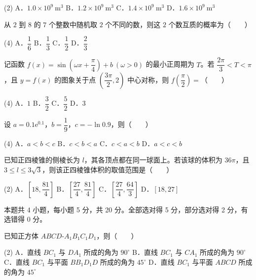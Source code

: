 \begin{gkopts}(2)
\task A．$1.0\times10^{9}\ \mathrm m^{3}$
\task B．$1.2\times10^{9}\ \mathrm m^{3}$
\task C．$1.4\times10^{9}\ \mathrm m^{3}$
\task D．$1.6\times10^{9}\ \mathrm m^{3}$
\end{gkopts}

从 $2$ 到 $8$ 的 $7$ 个整数中随机取 $2$ 个不同的数，则这 $2$ 个数互质的概率为（　　）

\begin{gkopts}(4)
\task A．$\dfrac16$
\task B．$\dfrac13$
\task C．$\dfrac12$
\task D．$\dfrac23$
\end{gkopts}

记函数 $f(x)=\sin\left(\omega x+\dfrac\pi4\right)+b\ (\omega>0)$ 的最小正周期为 $T$。若 $\dfrac{2\pi}3<T<\pi$，且 $y=f(x)$ 的图象关于点 $\left(\dfrac{3\pi}2,2\right)$ 中心对称，则 $f\left(\dfrac\pi2\right)=$（　　）

\begin{gkopts}(4)
\task A．$1$
\task B．$\dfrac32$
\task C．$\dfrac52$
\task D．$3$
\end{gkopts}

设 $a=0.1\mathrm e^{0.1}$，$b=\dfrac19$，$c=-\ln0.9$，则（　　）

\begin{gkopts}(4)
\task A．$a<b<c$
\task B．$c<b<a$
\task C．$c<a<b$
\task D．$a<c<b$
\end{gkopts}

已知正四棱锥的侧棱长为 $l$，其各顶点都在同一球面上。若该球的体积为 $36\pi$，且 $3\le l\le3\sqrt3$，则该正四棱锥体积的取值范围是（　　）

\begin{gkopts}(2)
\task A．$\left[18,\dfrac{81}4\right]$
\task B．$\left[\dfrac{27}4,\dfrac{81}4\right]$
\task C．$\left[\dfrac{27}4,\dfrac{64}3\right]$
\task D．$[18,27]$
\end{gkopts}

\par\medskip


\begin{gktip}
本题共 4 小题，每小题 5 分，共 20 分。全部选对得 5 分，部分选对得 2 分，有选错得 0 分。
\end{gktip}

已知正方体 $ABCD\text{-}A_1B_1C_1D_1$，则（　　）

\begin{gkopts}(2)
\task A．直线 $BC_1$ 与 $DA_1$ 所成的角为 $90^\circ$
\task B．直线 $BC_1$ 与 $CA_1$ 所成的角为 $90^\circ$
\task C．直线 $BC_1$ 与平面 $BB_1D_1D$ 所成的角为 $45^\circ$
\task D．直线 $BC_1$ 与平面 $ABCD$ 所成的角为 $45^\circ$
\end{gkopts}

